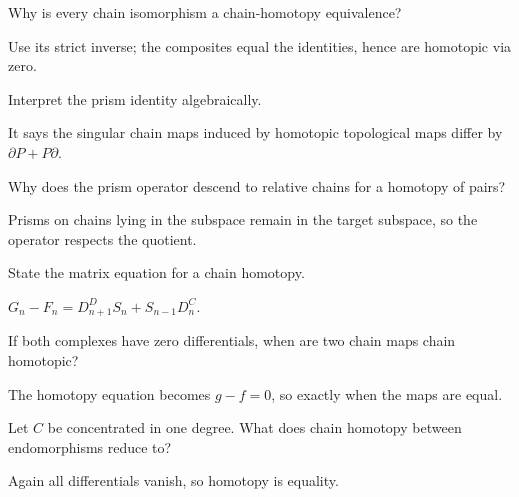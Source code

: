 \begin{problem}\label{prob:viii22-07}
Why is every chain isomorphism a chain-homotopy equivalence?
\end{problem}
\begin{solution}
Use its strict inverse; the composites equal the identities, hence are homotopic via zero.
\end{solution}

\begin{problem}[Prism]\label{prob:viii22-08}
Interpret the prism identity algebraically.
\end{problem}
\begin{solution}
It says the singular chain maps induced by homotopic topological maps differ by \(\partial P+P\partial\).
\end{solution}

\begin{problem}\label{prob:viii22-09}
Why does the prism operator descend to relative chains for a homotopy of pairs?
\end{problem}
\begin{solution}
Prisms on chains lying in the subspace remain in the target subspace, so the operator respects the quotient.
\end{solution}

\begin{problem}\label{prob:viii22-10}
State the matrix equation for a chain homotopy.
\end{problem}
\begin{solution}
\(G_n-F_n=D^D_{n+1}S_n+S_{n-1}D^C_n\).
\end{solution}

\begin{problem}\label{prob:viii22-11}
If both complexes have zero differentials, when are two chain maps chain homotopic?
\end{problem}
\begin{solution}
The homotopy equation becomes \(g-f=0\), so exactly when the maps are equal.
\end{solution}

\begin{problem}\label{prob:viii22-12}
Let \(C\) be concentrated in one degree. What does chain homotopy between endomorphisms reduce to?
\end{problem}
\begin{solution}
Again all differentials vanish, so homotopy is equality.
\end{solution}

